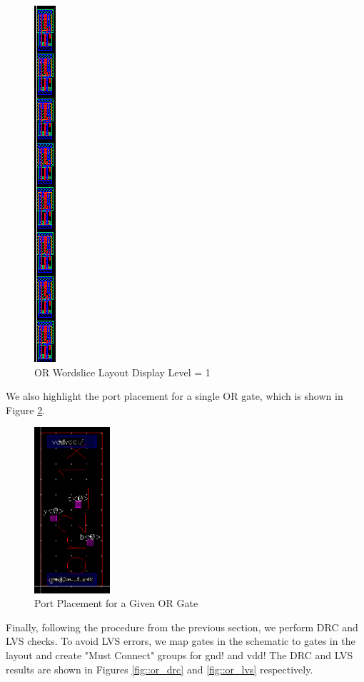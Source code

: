 \documentclass{article}
\begin{document}
	\begin{figure}[H]
		\centerline{\includegraphics[height=0.8\textwidth, angle=270]{or2_1x_8_layout_detailed.png}}
		\caption{OR Wordslice Layout Display Level = 1}
		\label{fig::or2_1x_8_layout_detailed}
	\end{figure}
	
	\noindent We also highlight the port placement for a single OR gate, which is shown in Figure \ref{fig::or2_1x_8_single_gate_ports}.
	
	\begin{figure}[H]
		\centerline{\includegraphics[width=0.25\textwidth]{or2_1x_8_single_gate_ports.png}}
		\caption{Port Placement for a Given OR Gate}
		\label{fig::or2_1x_8_single_gate_ports}
	\end{figure}
	
	\noindent Finally, following the procedure from the previous section, we perform DRC and LVS checks. To avoid LVS errors, we map gates in the schematic to gates in the layout and create "Must Connect" groups for gnd! and vdd! The DRC and LVS results are shown in Figures \ref{fig::or_drc} and \ref{fig::or_lvs} respectively.
	
\end{document}
